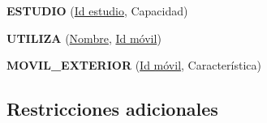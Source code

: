 \documentclass[a4paper,10pt]{article}
\begin{document}
    \begin{flushleft}
      {\bf{ESTUDIO}} (\underline{Id estudio}, Capacidad)
    \end{flushleft}
  
    \begin{flushleft}
      {\bf{UTILIZA}} (\underline{Nombre}, \underline{Id m\'ovil})
    \end{flushleft}
  
    \begin{flushleft}
      {\bf{MOVIL\_EXTERIOR}} (\underline{Id m\'ovil}, Caracter\'istica)
    \end{flushleft}
    
  \subsection{Restricciones adicionales}
\end{document}
